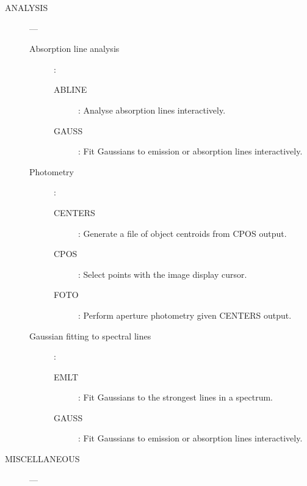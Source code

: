 \begin {description}
\item [ANALYSIS] ---

\begin{description}

\item [Absorption line analysis]\hspace{-1.5mm}:

\begin{description}
\item [ABLINE]: Analyse absorption lines interactively.
\item [GAUSS]: Fit Gaussians to emission or absorption lines interactively.
\end{description}

\item [Photometry]\hspace{-1.5mm}:
\begin{description}
\item [CENTERS]: Generate a file of object centroids from CPOS output.
\item [CPOS]: Select points with the image display cursor.
\item [FOTO]: Perform aperture photometry given CENTERS output.
\end{description}

\item [Gaussian fitting to spectral lines]\hspace{-1.5mm}:
\begin{description}
\item [EMLT]: Fit Gaussians to the strongest lines in a spectrum.
\item [GAUSS]: Fit Gaussians to emission or absorption lines interactively.
\end{description}

\end{description}

\item [MISCELLANEOUS] ---


\end{description}
